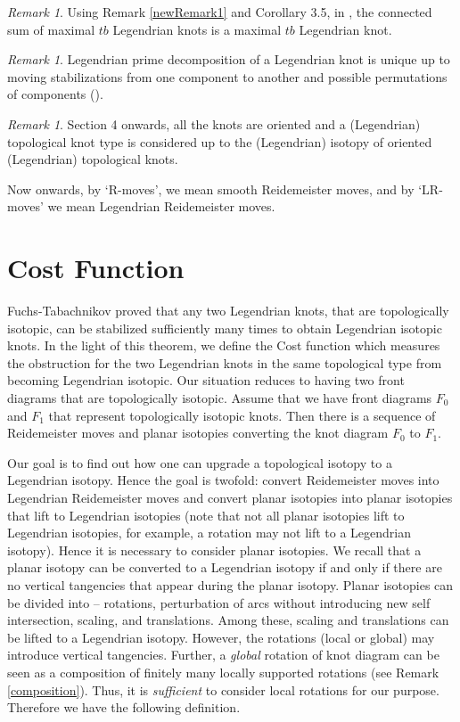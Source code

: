 \documentclass[11pt]{amsart}
\numberwithin{equation}{section}
\theoremstyle{plain}
\theoremstyle{definition}
\theoremstyle{remark} \newtheorem{remark}[equation]{Remark}
\theoremstyle{remark} \newtheorem{observation}[equation]{Observation}
\begin{document}
\begin{remark}\label{newRemark3}
    Using Remark \ref{newRemark1} and Corollary 3.5, in \cite{EH}, the connected sum of maximal $tb$ Legendrian knots is a maximal $tb$ Legendrian knot.
\end{remark}
\begin{remark}\label{newRemark}
    Legendrian prime decomposition of a Legendrian knot is unique up to moving stabilizations from one component to another and possible permutations of components (\cite{EH}). 
\end{remark}

\begin{remark}
    Section 4 onwards, all the knots are oriented and a (Legendrian) topological knot type is considered up to the (Legendrian) isotopy of oriented (Legendrian) topological knots.
\end{remark}


Now onwards, by `R-moves', we mean smooth Reidemeister moves, and by `LR-moves' we mean Legendrian Reidemeister moves.

\section{Cost Function}

Fuchs-Tabachnikov \cite{FT} proved that any two Legendrian knots, that are topologically isotopic, can be stabilized sufficiently many times to obtain 
Legendrian isotopic knots. In the light of this theorem, we define the Cost function which measures the obstruction for the two Legendrian knots in the same topological type from becoming Legendrian isotopic. 
Our situation reduces to having two front diagrams that are topologically isotopic. Assume that we have front diagrams $F_0$ and $F_1$ that represent topologically isotopic knots. Then there is a sequence of Reidemeister moves and 
planar isotopies converting the knot diagram $F_0$ to $F_1$. 

    Our goal is to find out how one can upgrade a topological isotopy to a Legendrian isotopy. 
Hence the goal is twofold: convert Reidemeister moves into Legendrian Reidemeister moves and convert planar isotopies into planar isotopies that lift to Legendrian isotopies (note that not all planar isotopies lift to Legendrian isotopies, for example, a rotation may not lift to a Legendrian isotopy). Hence it is necessary to consider planar isotopies.
    We recall that a planar isotopy can be converted to a Legendrian isotopy if and only if there are no vertical tangencies that appear during the planar isotopy. Planar isotopies can be divided into -- rotations, perturbation of arcs without introducing new self intersection, scaling, and translations. Among these, scaling 
and translations can be lifted to a Legendrian isotopy. However, the rotations (local or global) may introduce vertical tangencies. Further, a \textit{global}  rotation of knot diagram can be 
seen as a composition of finitely many locally supported rotations (see Remark \ref{composition}). Thus, it is \emph{sufficient} to consider local rotations for our purpose. 
Therefore we have the following definition.
\end{document}
